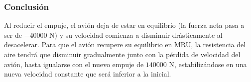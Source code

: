 \documentclass[12pt, a4paper]{article}
\begin{document}
\subsubsection*{Conclusión}
Al reducir el empuje, el avión deja de estar en equilibrio (la fuerza neta pasa a ser de $-40000 \text{ N}$) y su velocidad comienza a disminuir drásticamente al desacelerar. Para que el avión recupere su equilibrio en MRU, la resistencia del aire tendrá que disminuir gradualmente junto con la pérdida de velocidad del avión, hasta igualarse con el nuevo empuje de $140000 \text{ N}$, estabilizándose en una nueva velocidad constante que será inferior a la inicial.
\end{document}
